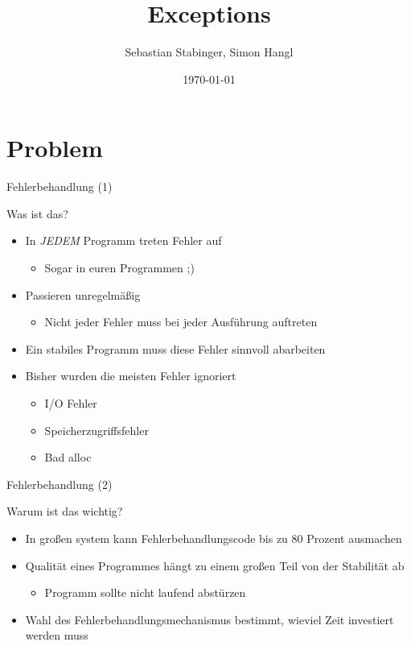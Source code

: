 \documentclass[presentation]{beamer}
\author{Sebastian Stabinger, Simon Hangl}
\date{\today}
\title{Exceptions}
\begin{document}
\maketitle

\section{Problem}
\label{sec-1}
\begin{frame}[fragile,label=sec-1-1]{Fehlerbehandlung (1)}
\begin{block}{Was ist das?}
	\begin{itemize}
		\item In \emph{JEDEM} Programm treten Fehler auf
		\begin{itemize}
			\item Sogar in euren Programmen ;)
		\end{itemize}
		\item Passieren unregelmäßig
		\begin{itemize}
			\item Nicht jeder Fehler muss bei jeder Ausführung auftreten
		\end{itemize}
		\item Ein stabiles Programm muss diese Fehler sinnvoll abarbeiten
		\item Bisher wurden die meisten Fehler ignoriert
		\begin{itemize}
			\item I/O Fehler
			\item Speicherzugriffsfehler
			\item Bad alloc
		\end{itemize}
	\end{itemize}
\end{block}

\end{frame}

\begin{frame}[fragile,label=sec-1-1]{Fehlerbehandlung (2)}
\begin{block}{Warum ist das wichtig?}
	\begin{itemize}
		\item In großen system kann Fehlerbehandlungscode bis zu 80 Prozent ausmachen
		\item Qualität eines Programmes hängt zu einem großen Teil von der Stabilität ab
		\begin{itemize}
			\item Programm sollte nicht laufend abstürzen
		\end{itemize}
		\item Wahl des Fehlerbehandlungsmechanismus bestimmt, wieviel Zeit investiert werden muss
	\end{itemize}
\end{block}

\end{frame}
\end{document}
